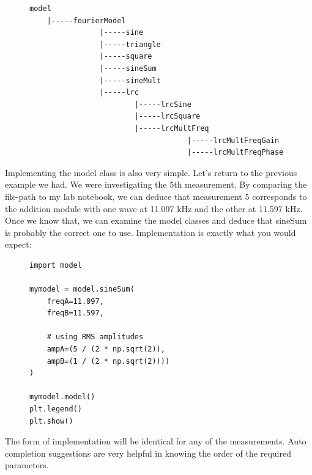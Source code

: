\documentclass{article}
\begin{document}
\begin{figure}[H]
\centering
\begin{minipage}{1\textwidth}
\begin{tcolorbox}
\begin{verbatim}
model
    |-----fourierModel
                |-----sine
                |-----triangle
                |-----square
                |-----sineSum
                |-----sineMult
                |-----lrc
                        |-----lrcSine
                        |-----lrcSquare
                        |-----lrcMultFreq
                                    |-----lrcMultFreqGain
                                    |-----lrcMultFreqPhase
\end{verbatim}
\end{tcolorbox}
\end{minipage}
\end{figure}

Implementing the model class is also very simple. Let's return to the previous
example we had. We were investigating the 5th measurement. By comparing the
file-path to my lab notebook, we can deduce that measurement 5 corresponds to
the addition module with one wave at 11.097 kHz and the other at 11.597 kHz.
Once we know that, we can examine the model classes and deduce that sineSum is
probably the correct one to use. Implementation is exactly what you would
expect:

\begin{figure}[H]
\centering
\begin{minipage}{1\textwidth}
\begin{tcolorbox}
\begin{verbatim}
import model

mymodel = model.sineSum(
    freqA=11.097, 
    freqB=11.597, 

    # using RMS amplitudes
    ampA=(5 / (2 * np.sqrt(2)), 
    ampB=(1 / (2 * np.sqrt(2))))
)

mymodel.model()
plt.legend()
plt.show()
\end{verbatim}
\end{tcolorbox}
\end{minipage}
\end{figure}

The form of implementation will be identical for any of the measurements.
Auto completion suggestions are very helpful in knowing the order of the
required parameters.
\end{document}
